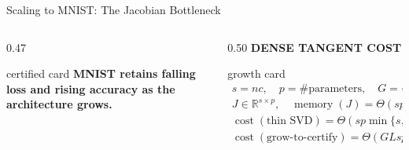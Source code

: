 \begin{frame}[t]{Scaling to MNIST: The Jacobian Bottleneck}
\begin{columns}[T,onlytextwidth]
\begin{column}{0.47\textwidth}
      \vspace{-0.03cm}
      \begin{beamercolorbox}[rounded=true,sep=0.06cm,wd=\linewidth]{certified card}
        {\fontsize{6.5}{7.8}\selectfont\bfseries
        MNIST retains falling loss and rising accuracy as the architecture grows.}
      \end{beamercolorbox}
    \end{column}

    \begin{column}{0.50\textwidth}
      {\color{EnstaBlue}\bfseries\scriptsize DENSE TANGENT COST}
      \vspace{0.03cm}

      \begin{beamercolorbox}[rounded=true,sep=0.10cm,wd=\linewidth]{growth card}
        \centering
        \fontsize{6.45}{7.7}\selectfont
        \(\displaystyle
          \begin{gathered}
            s=nc,\quad p=\#\text{parameters},\quad
            G=\#\text{growth steps},\quad L=\#\text{locations},\\[4pt]
            J\in\mathbb R^{s\times p},\quad
            \operatorname{memory}(J)=\Theta(sp),\\[4pt]
            \operatorname{cost}(\text{thin SVD})
            =\Theta\!\left(sp\min\{s,p\}\right),\\[4pt]
            \operatorname{cost}(\text{grow-to-certify})
            =\Theta\!\left(GLsp\min\{s,p\}\right).
          \end{gathered}
        \)
      \end{beamercolorbox}
    \end{column}
  \end{columns}
\end{frame}
